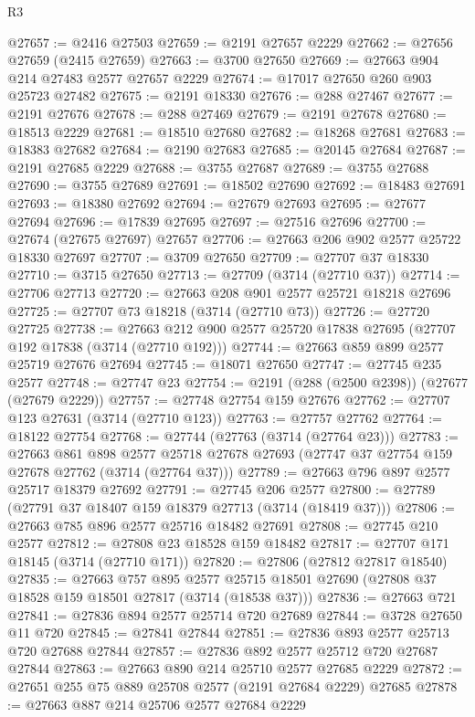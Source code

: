 \begin{lexlean}{R3}
\begin{coremodule}
@27657 := @2416 @27503
@27659 := @2191 @27657 @2229
@27662 := @27656 @27659 (@2415 @27659)
@27663 := @3700 @27650
@27669 := @27663 @904 @214 @27483 @2577 @27657 @2229
@27674 := @17017 @27650 @260 @903 @25723 @27482
@27675 := @2191 @18330
@27676 := @288 @27467
@27677 := @2191 @27676
@27678 := @288 @27469
@27679 := @2191 @27678
@27680 := @18513 @2229
@27681 := @18510 @27680
@27682 := @18268 @27681
@27683 := @18383 @27682
@27684 := @2190 @27683
@27685 := @20145 @27684
@27687 := @2191 @27685 @2229
@27688 := @3755 @27687
@27689 := @3755 @27688
@27690 := @3755 @27689
@27691 := @18502 @27690
@27692 := @18483 @27691
@27693 := @18380 @27692
@27694 := @27679 @27693
@27695 := @27677 @27694
@27696 := @17839 @27695
@27697 := @27516 @27696
@27700 := @27674 (@27675 @27697) @27657
@27706 := @27663 @206 @902 @2577 @25722 @18330 @27697
@27707 := @3709 @27650
@27709 := @27707 @37 @18330
@27710 := @3715 @27650
@27713 := @27709 (@3714 (@27710 @37))
@27714 := @27706 @27713
@27720 := @27663 @208 @901 @2577 @25721 @18218 @27696
@27725 := @27707 @73 @18218 (@3714 (@27710 @73))
@27726 := @27720 @27725
@27738 := @27663 @212 @900 @2577 @25720 @17838 @27695 (@27707 @192 @17838 (@3714 (@27710 @192)))
@27744 := @27663 @859 @899 @2577 @25719 @27676 @27694
@27745 := @18071 @27650
@27747 := @27745 @235 @2577
@27748 := @27747 @23
@27754 := @2191 (@288 (@2500 @2398)) (@27677 (@27679 @2229))
@27757 := @27748 @27754 @159 @27676
@27762 := @27707 @123 @27631 (@3714 (@27710 @123))
@27763 := @27757 @27762
@27764 := @18122 @27754
@27768 := @27744 (@27763 (@3714 (@27764 @23)))
@27783 := @27663
    @861
    @898
    @2577
    @25718
    @27678
    @27693
    (@27747 @37 @27754 @159 @27678 @27762 (@3714 (@27764 @37)))
@27789 := @27663 @796 @897 @2577 @25717 @18379 @27692
@27791 := @27745 @206 @2577
@27800 := @27789 (@27791 @37 @18407 @159 @18379 @27713 (@3714 (@18419 @37)))
@27806 := @27663 @785 @896 @2577 @25716 @18482 @27691
@27808 := @27745 @210 @2577
@27812 := @27808 @23 @18528 @159 @18482
@27817 := @27707 @171 @18145 (@3714 (@27710 @171))
@27820 := @27806 (@27812 @27817 @18540)
@27835 := @27663
    @757
    @895
    @2577
    @25715
    @18501
    @27690
    (@27808 @37 @18528 @159 @18501 @27817 (@3714 (@18538 @37)))
@27836 := @27663 @721
@27841 := @27836 @894 @2577 @25714 @720 @27689
@27844 := @3728 @27650 @11 @720
@27845 := @27841 @27844
@27851 := @27836 @893 @2577 @25713 @720 @27688 @27844
@27857 := @27836 @892 @2577 @25712 @720 @27687 @27844
@27863 := @27663 @890 @214 @25710 @2577 @27685 @2229
@27872 := @27651 @255 @75 @889 @25708 @2577 (@2191 @27684 @2229) @27685
@27878 := @27663 @887 @214 @25706 @2577 @27684 @2229

\end{coremodule}
\end{lexlean}
